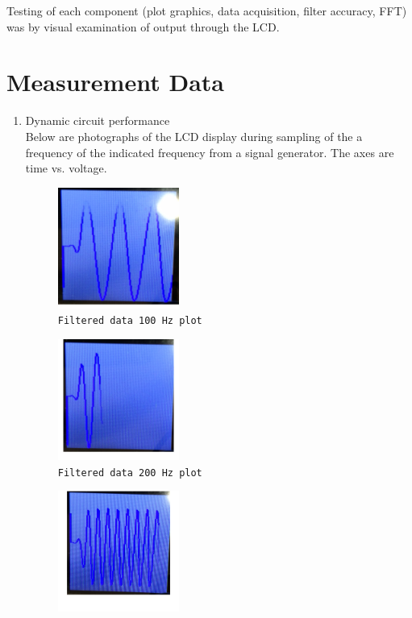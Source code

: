 \documentclass[12pt]{article}
\begin{document}
Testing of each component (plot graphics, data acquisition, filter
accuracy, FFT) was by visual examination of output through the
LCD.

\section{Measurement Data}
\begin{enumerate}
\item Dynamic circuit performance \\
  Below are photographs of the LCD display during sampling of the a
  frequency of the indicated frequency from a signal generator. The
  axes are time vs. voltage.
  \begin{paracol}{2}
    \begin{figure}[h!]
      \includegraphics[width=0.375\textwidth]{./img/filtered_100Hz}
      \caption{\texttt{Filtered data 100 Hz plot}}
      \label{fig:filtered_100}
    \end{figure}
    \switchcolumn
    \begin{figure}[h!]
      \includegraphics[width=0.375\textwidth]{./img/filtered_200Hz}
      \caption{\texttt{Filtered data 200 Hz plot}}
      \label{fig:filtered_200}
    \end{figure}
    \switchcolumn
    \begin{figure}[h!]
      \includegraphics[width=0.375\textwidth]{./img/filtered_300Hz}

\end{figure}
\end{paracol}
\end{enumerate}
\end{document}
